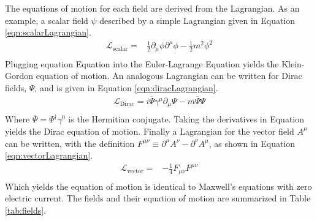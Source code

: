 The equations of motion for each field are derived from the Lagrangian.
As an example, a scalar field $\psi$ described by a simple Lagrangian given in Equation \ref{eqn:scalarLagrangian}.
\begin{equation}\begin{split}\label{eqn:scalarLagrangian}
    \mathcal{L}_\text{scalar}=&\frac{1}{2}\partial_\mu\phi\partial^\mu\phi-\frac{1}{2}m^2\phi^2 \\
\end{split}\end{equation}
Plugging equation Equation \label{eqn:scalarLagrangian} into the Euler-Lagrange Equation \label{eqn:el} yields the Klein-Gordon equation of motion.
An analogous Lagrangian can be written for Dirac fields, $\Psi$, and is given in Equation \ref{eqn:diracLagrangian}.
\begin{equation}\begin{split}\label{eqn:diracLagrangian}
    \mathcal{L}_\text{Dirac}=i\overline{\Psi}\gamma^\mu\partial_\mu\Psi-m\overline{\Psi}\Psi \\
\end{split}\end{equation} 
Where $\overline{\Psi}=\Psi^\dagger\gamma^0$ is the Hermitian conjugate.
Taking the derivatives in Equation \label{eqn:el} yields the Dirac equation of motion.
Finally a Lagrangian for the vector field $A^\mu$ can be written, with the definition $F^{\mu\nu}\equiv\partial^\mu A^\nu-\partial^\nu A^\mu$, as shown in Equation \ref{eqn:vectorLagrangian}.
\begin{equation}\begin{split}\label{eqn:vectorLagrangian}
    \mathcal{L}_\text{vector}=&-\frac{1}{4}F_{\mu\nu}F^{\mu\nu} \\
\end{split}\end{equation} 
Which yields the equation of motion is identical to Maxwell's equations with zero electric current.
The fields and their equation of motion are summarized in Table \ref{tab:fields}.

